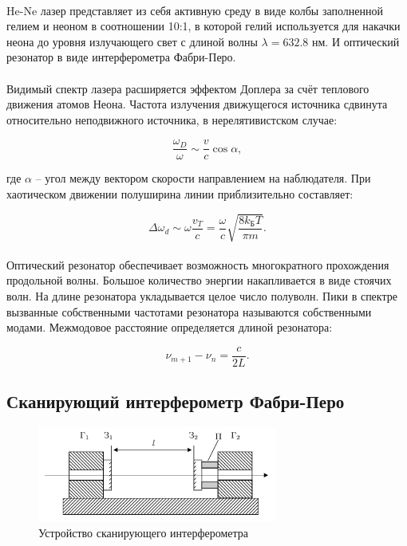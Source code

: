 \documentclass[a4paper,12pt]{article} %
\begin{document}
\paragraph{} He-Ne лазер представляет из себя активную среду в виде колбы заполненной гелием и неоном в соотношении 10:1, в которой гелий используется для накачки неона до уровня излучающего свет с длиной волны $\lambda = 632.8$ нм. И оптический резонатор в виде интерферометра Фабри-Перо.

\paragraph{} Видимый спектр лазера расширяется эффектом Доплера за счёт теплового движения атомов Неона. Частота излучения движущегося источника сдвинута относительно неподвижного источника, в нерелятивистском случае:

\[
\frac{\omega_D}{\omega} \sim \frac{v}{c}\cos{\alpha},
\]

\noindent где $\alpha$ -- угол между вектором скорости направлением на наблюдателя. При хаотическом движении полуширина линии приблизительно составляет:

\[
\Delta \omega_d \sim \omega \frac{v_T}{c} = \frac{\omega}{c}\sqrt{\frac{8k_\text{Б}T}{\pi m}}.
\]

\paragraph{} Оптический резонатор обеспечивает возможность многократного прохождения продольной волны. Большое количество энергии накапливается в виде стоячих волн. На длине резонатора укладывается целое число полуволн. Пики в спектре вызванные собственными частотами резонатора называются собственными модами. Межмодовое расстояние определяется длиной резонатора:

\begin{equation}
\nu_{m+1} - \nu_{n} = \frac{c}{2L}.
\label{modes}
\end{equation}

\subsection{Сканирующий интерферометр Фабри-Перо}

\begin{figure}
\centering
\includegraphics[width=0.7\textwidth]{interf.jpg}
\caption{Устройство сканирующего интерферометра}
\label{interf}
\end{figure}
\end{document}

